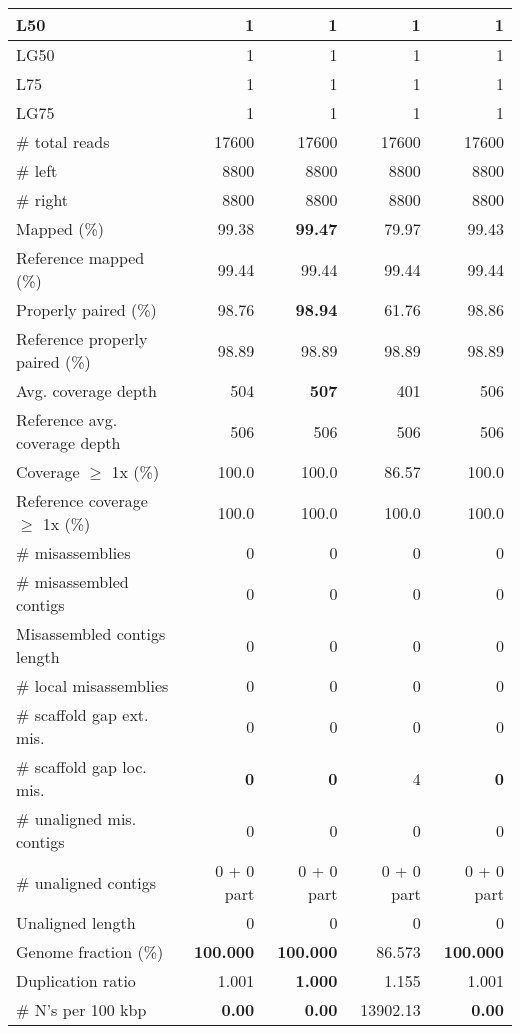 \documentclass[12pt,a4paper]{article}
\begin{document}
\begin{table}[ht]
\begin{center}
\begin{tabular}{|l*{4}{|r}|}
L50 & 1 & 1 & 1 & 1 \\ \hline
LG50 & 1 & 1 & 1 & 1 \\ \hline
L75 & 1 & 1 & 1 & 1 \\ \hline
LG75 & 1 & 1 & 1 & 1 \\ \hline
\# total reads & 17600 & 17600 & 17600 & 17600 \\ \hline
\# left & 8800 & 8800 & 8800 & 8800 \\ \hline
\# right & 8800 & 8800 & 8800 & 8800 \\ \hline
Mapped (\%) & 99.38 & {\bf 99.47} & 79.97 & 99.43 \\ \hline
Reference mapped (\%) & 99.44 & 99.44 & 99.44 & 99.44 \\ \hline
Properly paired (\%) & 98.76 & {\bf 98.94} & 61.76 & 98.86 \\ \hline
Reference properly paired (\%) & 98.89 & 98.89 & 98.89 & 98.89 \\ \hline
Avg. coverage depth & 504 & {\bf 507} & 401 & 506 \\ \hline
Reference avg. coverage depth & 506 & 506 & 506 & 506 \\ \hline
Coverage $\geq$ 1x (\%) & 100.0 & 100.0 & 86.57 & 100.0 \\ \hline
Reference coverage $\geq$ 1x (\%) & 100.0 & 100.0 & 100.0 & 100.0 \\ \hline
\# misassemblies & 0 & 0 & 0 & 0 \\ \hline
\# misassembled contigs & 0 & 0 & 0 & 0 \\ \hline
Misassembled contigs length & 0 & 0 & 0 & 0 \\ \hline
\# local misassemblies & 0 & 0 & 0 & 0 \\ \hline
\# scaffold gap ext. mis. & 0 & 0 & 0 & 0 \\ \hline
\# scaffold gap loc. mis. & {\bf 0} & {\bf 0} & 4 & {\bf 0} \\ \hline
\# unaligned mis. contigs & 0 & 0 & 0 & 0 \\ \hline
\# unaligned contigs & 0 + 0 part & 0 + 0 part & 0 + 0 part & 0 + 0 part \\ \hline
Unaligned length & 0 & 0 & 0 & 0 \\ \hline
Genome fraction (\%) & {\bf 100.000} & {\bf 100.000} & 86.573 & {\bf 100.000} \\ \hline
Duplication ratio & 1.001 & {\bf 1.000} & 1.155 & 1.001 \\ \hline
\# N's per 100 kbp & {\bf 0.00} & {\bf 0.00} & 13902.13 & {\bf 0.00} \\ \hline

\end{tabular}
\end{center}
\end{table}
\end{document}
